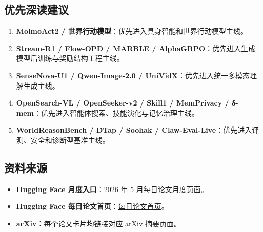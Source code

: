 \subsection{优先深读建议}
\begin{enumerate}[leftmargin=1.5em]
  \item \textbf{MolmoAct2 / 世界行动模型}：优先进入具身智能和世界行动模型主线。
  \item \textbf{Stream-R1 / Flow-OPD / MARBLE / AlphaGRPO}：优先进入生成模型后训练与奖励结构工程主线。
  \item \textbf{SenseNova-U1 / Qwen-Image-2.0 / UniVidX}：优先进入统一多模态理解生成主线。
  \item \textbf{OpenSearch-VL / OpenSeeker-v2 / Skill1 / MemPrivacy / δ-mem}：优先进入智能体搜索、技能演化与记忆治理主线。
  \item \textbf{WorldReasonBench / DTap / Soohak / Claw-Eval-Live}：优先进入评测、安全和诊断型基准主线。
\end{enumerate}

\subsection{资料来源}
\begin{itemize}[leftmargin=1.5em]
  \item \textbf{Hugging Face 月度入口}：\href{https://huggingface.co/papers/month/2026-05}{2026 年 5 月每日论文月度页面}。
  \item \textbf{Hugging Face 每日论文首页}：\href{https://huggingface.co/papers}{每日论文首页}。
  \item \textbf{arXiv}：每个论文卡片均链接对应 arXiv 摘要页面。
\end{itemize}
